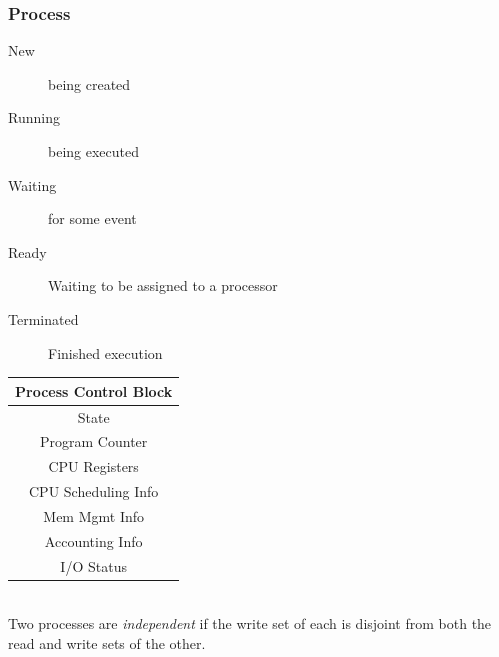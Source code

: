 \documentclass[a4paper]{article}
\begin{document}
\begin{multicols*}{2}
    \vspace*{-2em}
    \subsubsection*{Process}
    \begin{multicols*}{2}
        \columnbreak
        \begin{flushright}
            \vspace*{-2.5em}
            \begin{description}
                \item[New] being created
                \item[Running] being executed
                \item[Waiting] for some event
                \item[Ready] Waiting to be assigned to a processor
                \item[Terminated] Finished execution
            \end{description}
        \end{flushright}
    \end{multicols*}

    \begin{multicols*}{2}
        \begin{tabular}{|c|}
            \hline
            \textbf{Process Control Block} \\
            \hline
            State                          \\
            \hline
            Program Counter                \\
            \hline
            CPU Registers                  \\
            \hline
            CPU Scheduling Info            \\
            \hline
            Mem Mgmt Info                  \\
            \hline
            Accounting Info                \\
            \hline
            I/O Status                     \\
            \hline
        \end{tabular}
        \columnbreak \\
        Two processes are \emph{independent} if the write set of each is disjoint
        from both the read and write sets of the other.
    \end{multicols*}

\end{multicols*}
\end{document}
